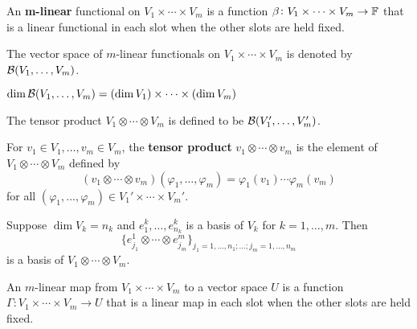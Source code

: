 \documentclass{extarticle}
\begin{document}
\begin{definition}
    An \textbf{m-linear} functional on \(V_1 \times \cdots \times V_m\) is a function 
    \(\beta \colon V_1 \times \cdots \times V_m \to \mathbb{F}\) that is a linear functional in 
    each slot when the other slots are held fixed. 

    The vector space of \(m\)-linear functionals on \(V_1 \times \cdots \times V_m\) is denoted by 
    \(\mathcal{B}(V_1, \ldots, V_m)\).
\end{definition}

\begin{corollary}
    \(\dim \mathcal{B} (V_1, \ldots, V_m) = (\dim V_1) \times \cdots \times (\dim V_m)\)
\end{corollary}

\begin{definition}
    The tensor product \(V_1 \otimes \cdots \otimes V_m\) is defined to be \(\mathcal{B}(V_1', \ldots, V_m')\). 

    For \(v_1 \in V_1, \ldots, v_m \in V_m\), the \textbf{tensor product} \(v_1 \otimes \cdots \otimes v_m\)
    is the element of \(V_1 \otimes \cdots \otimes V_m\) defined by 
    \[(v_1 \otimes \cdots \otimes v_m) (\varphi_1, \ldots, \varphi_m) = \varphi_1(v_1)\cdots \varphi_m(v_m)\]
    for all \((\varphi_1, \ldots, \varphi_m) \in V_1' \times \cdots \times V_m'\).
\end{definition}

\begin{corollary}
    Suppose \(\dim V_k = n_k\) and \(e_1^k, \ldots, e_{n_k}^k\) is a basis of \(V_k\) for 
    \(k = 1, \ldots, m\). Then 
    \[\{e_{j_1}^1 \otimes \cdots \otimes e_{j_m}^m\}_{j_1 = 1, \ldots, n_1; \ldots; j_m = 1, \ldots, n_m}\]
    is a basis of \(V_1 \otimes \cdots \otimes V_m\).
\end{corollary}

\begin{definition}
    An \(m\)-linear map from \(V_1 \times \cdots \times V_m\) to a vector space \(U\) is a function 
    \(\Gamma \colon V_1 \times \cdots \times V_m \to U\) that is a linear map in each slot when the other 
    slots are held fixed. 
\end{definition}
\end{document}
